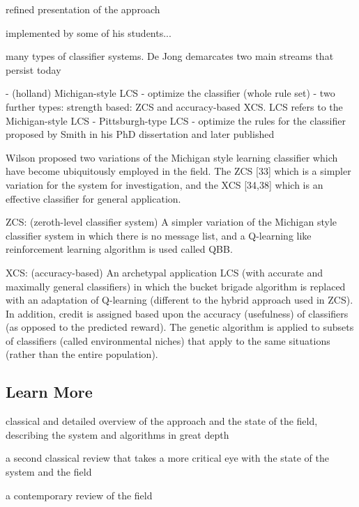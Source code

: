 \documentclass[a4paper, 11pt]{article}
\begin{document}
refined presentation of the approach \cite{Holland1989}

implemented by some of his students...

many types of classifier systems. De Jong demarcates two main streams that persist today \cite{Jong1988}

- (holland) Michigan-style LCS - optimize the classifier (whole rule set) 
	- two further types: strength based: ZCS and accuracy-based XCS.
LCS refers to the Michigan-style LCS
- Pittsburgh-type LCS - optimize the rules for the classifier proposed by Smith in his PhD dissertation \cite{Smith1980} and later published \cite{Smith1983}

Wilson proposed two variations of the Michigan style learning classifier which have become ubiquitously employed in the field. The ZCS [33] which is a simpler variation for the system for investigation, and the XCS [34,38] which is an effective classifier for general application.

ZCS: (zeroth-level classifier system) A simpler variation of the Michigan style classifier system in which there is no message list, and a Q-learning like reinforcement learning algorithm is used called QBB. \cite{Wilson1994}

XCS: (accuracy-based) An archetypal application LCS (with accurate and maximally general classifiers) in which the bucket brigade algorithm is replaced with an adaptation of Q-learning (different to the hybrid approach used in ZCS). In addition, credit is assigned based upon the accuracy (usefulness) of classifiers (as opposed to the predicted reward). The genetic algorithm is applied to subsets of classifiers (called environmental niches) that apply to the same situations (rather than the entire population). \cite{Wilson1995}



% 
% 
\subsection{Learn More}

classical and detailed overview of the approach and the state of the field, describing the system and algorithms in great depth \cite{Booker1989}

a second classical review that takes a more critical eye with the state of the system and the field \cite{Wilson1989}

a contemporary review of the field \cite{Holmes2002}
\end{document}
